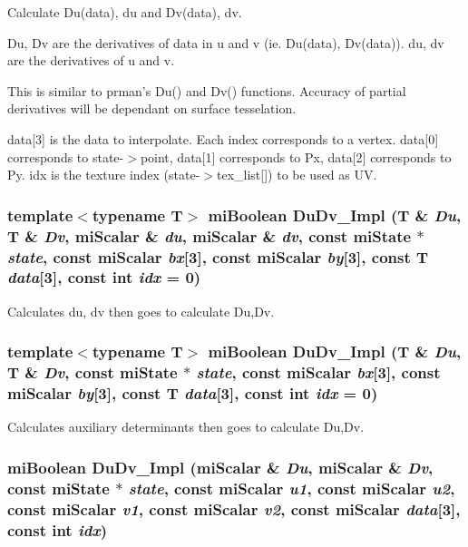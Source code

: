 Calculate Du(data), du and Dv(data), dv.

Du, Dv are the derivatives of data in u and v (ie. Du(data), Dv(data)). du, dv are the derivatives of u and v.

This is similar to prman's Du() and Dv() functions. Accuracy of partial derivatives will be dependant on surface tesselation.

data[3] is the data to interpolate. Each index corresponds to a vertex. data[0] corresponds to state-$>$point, data[1] corresponds to Px, data[2] corresponds to Py. idx is the texture index (state-$>$tex\_\-list[]) to be used as UV. 
\subsubsection{\setlength{\rightskip}{0pt plus 5cm}template$<$typename T$>$ mi\-Boolean Du\-Dv\_\-Impl (T \& {\em Du}, T \& {\em Dv}, mi\-Scalar \& {\em du}, mi\-Scalar \& {\em dv}, const mi\-State $\ast$ {\em state}, const mi\-Scalar {\em bx}[3], const mi\-Scalar {\em by}[3], const T {\em data}[3], const int {\em idx} = 0)\hspace{0.3cm}{\tt  [inline]}}\label{namespacemr_a41}


Calculates du, dv then goes to calculate Du,Dv. 

\subsubsection{\setlength{\rightskip}{0pt plus 5cm}template$<$typename T$>$ mi\-Boolean Du\-Dv\_\-Impl (T \& {\em Du}, T \& {\em Dv}, const mi\-State $\ast$ {\em state}, const mi\-Scalar {\em bx}[3], const mi\-Scalar {\em by}[3], const T {\em data}[3], const int {\em idx} = 0)\hspace{0.3cm}{\tt  [inline]}}\label{namespacemr_a40}


Calculates auxiliary determinants then goes to calculate Du,Dv. 

\subsubsection{\setlength{\rightskip}{0pt plus 5cm}mi\-Boolean Du\-Dv\_\-Impl (mi\-Scalar \& {\em Du}, mi\-Scalar \& {\em Dv}, const mi\-State $\ast$ {\em state}, const mi\-Scalar {\em u1}, const mi\-Scalar {\em u2}, const mi\-Scalar {\em v1}, const mi\-Scalar {\em v2}, const mi\-Scalar {\em data}[3], const int {\em idx})\hspace{0.3cm}{\tt  [inline]}}\label{namespacemr_a39}


